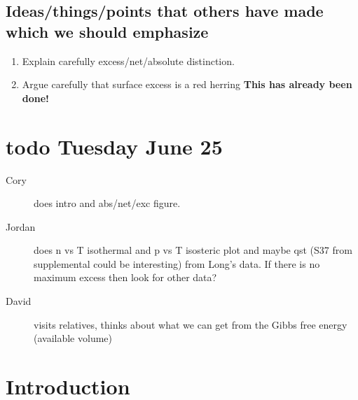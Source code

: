 \documentclass[letterpaper,twocolumn,amsmath,amssymb,jcp,aps,10pt]{revtex4-1}
\begin{document}
\subsection{Ideas/things/points that others have made which we should emphasize}
\begin{enumerate}
 \item Explain carefully excess/net/absolute distinction.
    \item Argue carefully that surface excess is a red herring \textbf{This has already been done!}
\end{enumerate}

\section*{todo Tuesday June 25}

\begin{description}
    \item[Cory] does intro and abs/net/exc figure.
    \item[Jordan] does n vs T isothermal and p vs T isosteric plot and maybe qst (S37 from supplemental could be interesting) from Long's data.  If there is no maximum excess then look for other data?
    \item[David] visits relatives, thinks about what we can get from the Gibbs free energy (available volume)
\end{description}

\newcommand\Nabs{N_{\text{abs}}}
\newcommand\Sabs{S_{\text{abs}}}
\newcommand\Gabs{G_{\text{abs}}}
\newcommand\sabs{s_{\text{abs}}}
\newcommand\vabs{v_{\text{abs}}}
\newcommand\muads{\mu_{\text{ads}}}

\newcommand\Nmof{N_{\text{MOF}}}
\newcommand\Vmof{V_{\text{MOF}}}
\newcommand\mumof{\mu_{\text{MOF}}}

\newcommand\Ngas{N_{\text{gas}}}
\newcommand\Sgas{S_{\text{gas}}}
\newcommand\sgas{s_{\text{gas}}}
\newcommand\Vgas{V_{\text{gas}}}
\newcommand\vgas{v_{\text{gas}}}
\newcommand\mugas{\mu_{\text{gas}}}

\newcommand\pisostere{p_{\text{iosteric}}} %

\section{Introduction}
\end{document}
